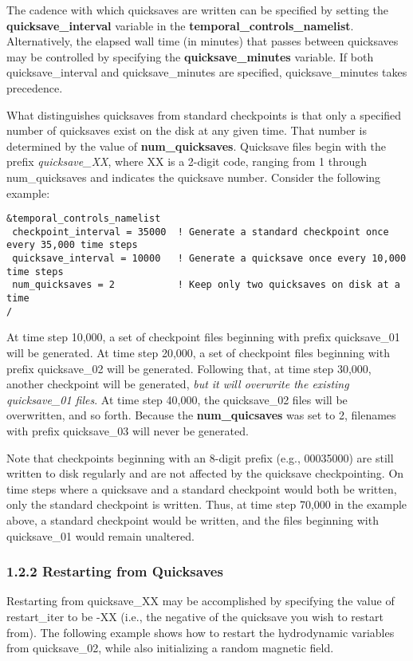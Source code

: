The cadence with which quicksaves are written can be specified by setting the \textbf{quicksave\_interval} variable in the \textbf{temporal\_controls\_namelist}.  Alternatively, the elapsed wall time (in minutes) that passes between quicksaves may be controlled by specifying the \textbf{quicksave\_minutes} variable.  If both quicksave\_interval and quicksave\_minutes are specified, quicksave\_minutes takes precedence.

What distinguishes quicksaves from standard checkpoints is that only a specified number of quicksaves exist on the disk at any given time.  That number is determined by the value of \textbf{num\_quicksaves}.  Quicksave files begin with the prefix \textit{quicksave\_XX}, where XX is a 2-digit code, ranging from 1 through num\_quicksaves and indicates the quicksave number.  Consider the following example:
\begin{lstlisting}
&temporal_controls_namelist
 checkpoint_interval = 35000  ! Generate a standard checkpoint once every 35,000 time steps
 quicksave_interval = 10000   ! Generate a quicksave once every 10,000 time steps
 num_quicksaves = 2           ! Keep only two quicksaves on disk at a time
/
\end{lstlisting}
At time step 10,000, a set of checkpoint files beginning with prefix quicksave\_01 will be generated.  At time step 20,000, a set of checkpoint files beginning with prefix quicksave\_02 will be generated.  Following that, at time step 30,000, another checkpoint will be generated, \textit{but it will overwrite the existing quicksave\_01 files}.  At time step 40,000, the quicksave\_02 files will be overwritten, and so forth.  Because the \textbf{num\_quicsaves} was set to 2, filenames with prefix quicksave\_03 will never be generated.

Note that checkpoints beginning with an 8-digit prefix (e.g., 00035000) are still written to disk regularly and are not affected by the quicksave checkpointing.  On time steps where  a quicksave and a standard checkpoint would both be written, only the standard checkpoint is written.  Thus, at time step 70,000 in the example above, a standard checkpoint would be written, and the files beginning with quicksave\_01 would remain unaltered.

\subsubsection{1.2.2 Restarting from Quicksaves}
Restarting from quicksave\_XX may be accomplished by specifying the value of restart\_iter to be -XX (i.e., the negative of the quicksave you wish to restart from).  The following example shows how to restart the hydrodynamic variables from quicksave\_02, while also initializing a random magnetic field.

